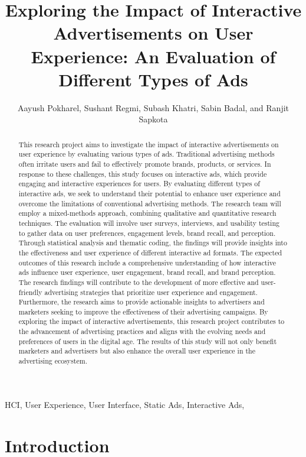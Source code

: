 \documentclass[journal]{IEEEtran}
\title{Exploring the Impact of Interactive Advertisements on User Experience: An Evaluation of Different Types of  Ads}
\author{Aayush Pokharel,
Sushant Regmi,
Subash Khatri,
    Sabin Badal,
    and Ranjit Sapkota}
\begin{document}
\maketitle

\begin{abstract}
    This research project aims to investigate the impact of interactive
    advertisements on user experience by evaluating various types of ads.
    Traditional advertising methods often irritate users and fail to
    effectively promote brands, products, or services. In response to
    these challenges, this study focuses on interactive ads, which provide
    engaging and interactive experiences for users. By evaluating different
    types of interactive ads, we seek to understand their potential to
    enhance user experience and overcome the limitations of conventional
    advertising methods. The research team will employ a mixed-methods
    approach, combining qualitative and quantitative research techniques.
    The evaluation will involve user surveys, interviews, and usability
    testing to gather data on user preferences, engagement levels, brand
    recall, and perception. Through statistical analysis and thematic coding,
    the findings will provide insights into the effectiveness and user
    experience of different interactive ad formats. The expected outcomes of
    this research include a comprehensive understanding of how interactive ads
    influence user experience, user engagement, brand recall, and brand perception.
    The research findings will contribute to the development of more effective
    and user-friendly advertising strategies that prioritize user experience
    and engagement. Furthermore, the research aims to provide actionable insights
    to advertisers and marketers seeking to improve the effectiveness of their
    advertising campaigns. By exploring the impact of interactive advertisements,
    this research project contributes to the advancement of advertising practices
    and aligns with the evolving needs and preferences of users in the digital age.
    The results of this study will not only benefit marketers and advertisers but
    also enhance the overall user experience in the advertising ecosystem.
\end{abstract}

\begin{IEEEkeywords}
    HCI, User Experience, User Interface, Static Ads, Interactive Ads,
\end{IEEEkeywords}

\section{Introduction}
\end{document}
